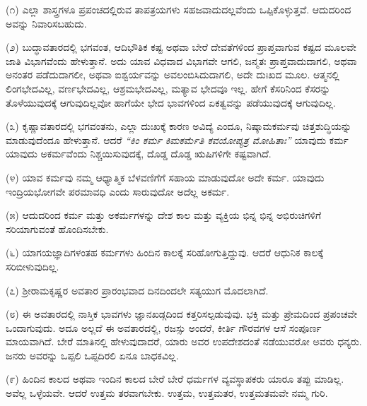 (೧) ಎಲ್ಲಾ ಶಾಸ್ತ್ರಗಳೂ ಪ್ರಪಂಚದಲ್ಲಿರುವ ತಾಪತ್ರಯಗಳು ಸಹಜವಾದುದಲ್ಲವೆಂದು ಒಪ್ಪಿಕೊಳ್ಳುತ್ತವೆ. ಆದುದರಿಂದ ಅವನ್ನು ನಿವಾರಿಸಬಹುದು.

\vspace{0.1cm}

(೨) ಬುದ್ಧಾವತಾರದಲ್ಲಿ ಭಗವಂತ, ಆದಿಭೌತಿಕ ಕಷ್ಟ ಅಥವಾ ಬೇರೆ ದೇವತೆಗಳಿಂದ ಪ್ರಾಪ್ತವಾಗುವ ಕಷ್ಟದ ಮೂಲವೇ ಜಾತಿ ವಿಭಾಗವೆಂದು ಹೇಳುತ್ತಾನೆ. ಅದು ಯಾವ ವಿಧವಾದ ವಿಭಾಗವೇ ಆಗಲಿ, ಜನ್ಮತಃ ಪ್ರಾಪ್ತವಾದುದಾಗಲಿ, ಅಥವಾ ಅನಂತರ ಪಡೆದುದಾಗಲೀ, ಅಥವಾ ಐಶ್ವರ್ಯವನ್ನು ಅವಲಂಬಿಸಿದುದಾಗಲಿ, ಅದೇ ದುಃಖದ ಮೂಲ. ಆತ್ಮನಲ್ಲಿ ಲಿಂಗಭೇದವಿಲ್ಲ, ವರ್ಣಭೇದವಿಲ್ಲ, ಆಶ್ರಮಭೇದವಿಲ್ಲ, ಮತ್ಯಾವ ಭೇದವೂ ಇಲ್ಲ. ಹೇಗೆ ಕೆಸರಿನಿಂದ ಕೆಸರನ್ನು ತೊಳೆಯುವುದಕ್ಕೆ ಆಗುವುದಿಲ್ಲವೋ ಹಾಗೆಯೇ ಭೇದ ಭಾವಗಳಿಂದ ಏಕತ್ವವನ್ನು ಪಡೆಯುವುದಕ್ಕೆ ಆಗುವುದಿಲ್ಲ.

\vspace{0.1cm}

(೩) ಕೃಷ್ಣಾವತಾರದಲ್ಲಿ ಭಗವಂತನು, ಎಲ್ಲಾ ದುಃಖಕ್ಕೆ ಕಾರಣ ಅವಿದ್ಯೆ ಎಂದೂ, ನಿಷ್ಕಾಮಕರ್ಮವು ಚಿತ್ತಶುದ್ಧಿಯನ್ನು ಮಾಡುವುದೆಂದೂ ಹೇಳುತ್ತಾನೆ. ಆದರೆ \textit{“ಕಿಂ ಕರ್ಮ ಕಿಮಕರ್ಮೆತಿ ಕವಯೋಪ್ಯತ್ರ ಮೋಹಿತಾಃ”}\enginline{-} ಯಾವುದು ಕರ್ಮ ಯಾವುದು ಅಕರ್ಮವೆಂದು ನಿಶ್ಚಯಿಸುವುದಕ್ಕೆ, ದೊಡ್ಡ ದೊಡ್ಡ ಋಷಿಗಳಿಗೇ ಕಷ್ಟವಾಗಿದೆ.

\vspace{0.1cm}

(೪) ಯಾವ ಕರ್ಮವು ನಮ್ಮ ಆಧ್ಯಾತ್ಮಿಕ ಬೆಳವಣಿಗೆಗೆ ಸಹಾಯ ಮಾಡುವುದೋ ಅದೇ ಕರ್ಮ. ಯಾವುದು ಇಂದ್ರಿಯಭೋಗವೇ ಪರಮಾವಧಿ ಎಂದು ಸಾರುವುದೋ ಅದೆಲ್ಲ ಅಕರ್ಮ.

\vspace{0.1cm}

(೫) ಆದುದರಿಂದ ಕರ್ಮ ಮತ್ತು ಅಕರ್ಮಗಳನ್ನು ದೇಶ ಕಾಲ ಮತ್ತು ವ್ಯಕ್ತಿಯ ಭಿನ್ನ ಭಿನ್ನ ಅಭಿರುಚಿಗಳಿಗೆ ಸರಿಯಾಗುವಂತೆ ಹೊಂದಿಸಬೇಕು.

\vspace{0.1cm}

(೬) ಯಾಗಯಜ್ಞಾದಿಗಳಂತಹ ಕರ್ಮಗಳು ಹಿಂದಿನ ಕಾಲಕ್ಕೆ ಸರಿಹೋಗುತ್ತಿದ್ದುವು. ಆದರೆ ಆಧುನಿಕ ಕಾಲಕ್ಕೆ ಸರಿಬೀಳುವುದಿಲ್ಲ.

\vspace{0.1cm}

(೭) ಶ‍್ರೀರಾಮಕೃಷ್ಣರ ಅವತಾರ ಪ್ರಾರಂಭವಾದ ದಿನದಿಂದಲೇ ಸತ್ಯಯುಗ ಮೊದಲಾಗಿದೆ.

\eject

(೮) ಈ ಅವತಾರದಲ್ಲಿ ನಾಸ್ತಿಕ ಭಾವಗಳು ಜ್ಞಾನಖಡ್ಗದಿಂದ ಕತ್ತರಿಸಲ್ಪಡುವುವು. ಭಕ್ತಿ ಮತ್ತು ಪ್ರೇಮದಿಂದ ಪ್ರಪಂಚವೇ ಒಂದಾಗುವುದು. ಅದೂ ಅಲ್ಲದೆ ಈ ಅವತಾರದಲ್ಲಿ, ರಜಸ್ಸು ಅಂದರೆ, ಕೀರ್ತಿ ಗೌರವಗಳ ಆಸೆ ಸಂಪೂರ್ಣ ಮಾಯವಾಗಿದೆ. ಬೇರೆ ಮಾತಿನಲ್ಲಿ ಹೇಳುವುದಾದರೆ, ಯಾರು ಅವರ ಉಪದೇಶದಂತೆ ನಡೆಯುವರೋ ಅವರು ಧನ್ಯರು. ಜನರು ಅವರನ್ನು ಒಪ್ಪಲಿ ಒಪ್ಪದಿರಲಿ ಏನೂ ಬಾಧಕವಿಲ್ಲ.

\vspace{0.1cm}

(೯) ಹಿಂದಿನ ಕಾಲದ ಅಥವಾ ಇಂದಿನ ಕಾಲದ ಬೇರೆ ಬೇರೆ ಧರ್ಮಗಳ ವ್ಯವಸ್ಥಾಪಕರು ಯಾರೂ ತಪ್ಪು ಮಾಡಿಲ್ಲ. ಅವೆಲ್ಲ ಒಳ್ಳೆಯವೇ. ಆದರೆ ಉತ್ತಮ ತರವಾಗಬೇಕು. ಉತ್ತಮ, ಉತ್ತಮತರ, ಉತ್ತಮತಮವೇ ನಮ್ಮ ಗುರಿ.

